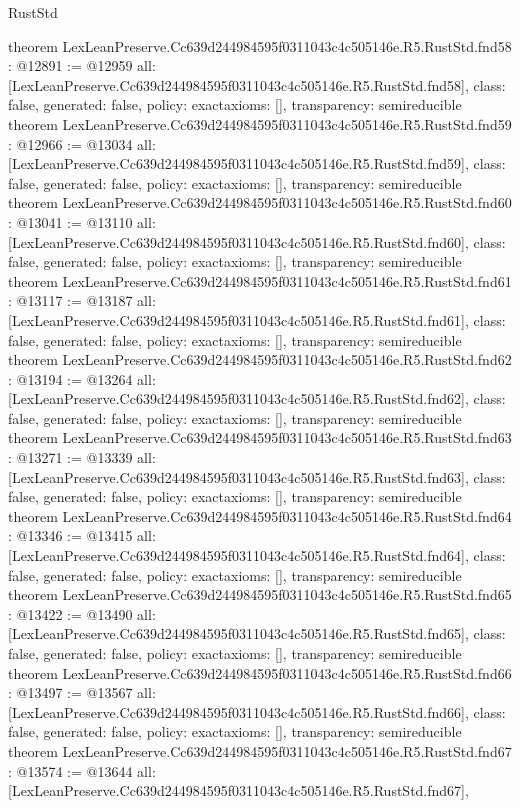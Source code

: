 \begin{lexlean}{RustStd}
\begin{coremodule}
{}
theorem LexLeanPreserve.Cc639d244984595f0311043c4c505146e.R5.RustStd.fnd58 : @12891 := @12959 {
  all: [LexLeanPreserve.Cc639d244984595f0311043c4c505146e.R5.RustStd.fnd58],
  class: false,
  generated: false,
  policy: exact{axioms: []},
  transparency: semireducible
}
theorem LexLeanPreserve.Cc639d244984595f0311043c4c505146e.R5.RustStd.fnd59 : @12966 := @13034 {
  all: [LexLeanPreserve.Cc639d244984595f0311043c4c505146e.R5.RustStd.fnd59],
  class: false,
  generated: false,
  policy: exact{axioms: []},
  transparency: semireducible
}
theorem LexLeanPreserve.Cc639d244984595f0311043c4c505146e.R5.RustStd.fnd60 : @13041 := @13110 {
  all: [LexLeanPreserve.Cc639d244984595f0311043c4c505146e.R5.RustStd.fnd60],
  class: false,
  generated: false,
  policy: exact{axioms: []},
  transparency: semireducible
}
theorem LexLeanPreserve.Cc639d244984595f0311043c4c505146e.R5.RustStd.fnd61 : @13117 := @13187 {
  all: [LexLeanPreserve.Cc639d244984595f0311043c4c505146e.R5.RustStd.fnd61],
  class: false,
  generated: false,
  policy: exact{axioms: []},
  transparency: semireducible
}
theorem LexLeanPreserve.Cc639d244984595f0311043c4c505146e.R5.RustStd.fnd62 : @13194 := @13264 {
  all: [LexLeanPreserve.Cc639d244984595f0311043c4c505146e.R5.RustStd.fnd62],
  class: false,
  generated: false,
  policy: exact{axioms: []},
  transparency: semireducible
}
theorem LexLeanPreserve.Cc639d244984595f0311043c4c505146e.R5.RustStd.fnd63 : @13271 := @13339 {
  all: [LexLeanPreserve.Cc639d244984595f0311043c4c505146e.R5.RustStd.fnd63],
  class: false,
  generated: false,
  policy: exact{axioms: []},
  transparency: semireducible
}
theorem LexLeanPreserve.Cc639d244984595f0311043c4c505146e.R5.RustStd.fnd64 : @13346 := @13415 {
  all: [LexLeanPreserve.Cc639d244984595f0311043c4c505146e.R5.RustStd.fnd64],
  class: false,
  generated: false,
  policy: exact{axioms: []},
  transparency: semireducible
}
theorem LexLeanPreserve.Cc639d244984595f0311043c4c505146e.R5.RustStd.fnd65 : @13422 := @13490 {
  all: [LexLeanPreserve.Cc639d244984595f0311043c4c505146e.R5.RustStd.fnd65],
  class: false,
  generated: false,
  policy: exact{axioms: []},
  transparency: semireducible
}
theorem LexLeanPreserve.Cc639d244984595f0311043c4c505146e.R5.RustStd.fnd66 : @13497 := @13567 {
  all: [LexLeanPreserve.Cc639d244984595f0311043c4c505146e.R5.RustStd.fnd66],
  class: false,
  generated: false,
  policy: exact{axioms: []},
  transparency: semireducible
}
theorem LexLeanPreserve.Cc639d244984595f0311043c4c505146e.R5.RustStd.fnd67 : @13574 := @13644 {
  all: [LexLeanPreserve.Cc639d244984595f0311043c4c505146e.R5.RustStd.fnd67],
}
\end{coremodule}
\end{lexlean}
